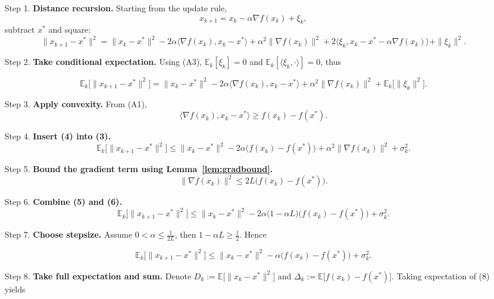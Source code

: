\documentclass{article}
\begin{document}
\begin{enumerate}
\item[Step 1.] \textbf{Distance recursion.}  
Starting from the update rule,
\[
x_{k+1}=x_k-\alpha\nabla f(x_k)+\xi_k,
\]
subtract $x^{*}$ and square:
\[
\|x_{k+1}-x^{*}\|^{2}
 =\|x_k-x^{*}\|^{2}
 -2\alpha\langle\nabla f(x_k),x_k-x^{*}\rangle
 +\alpha^{2}\|\nabla f(x_k)\|^{2}
 +2\langle\xi_k, x_k-x^{*}-\alpha\nabla f(x_k)\rangle
 +\|\xi_k\|^{2}.
\tag{2}
\]

\item[Step 2.] \textbf{Take conditional expectation.}  
Using (A3), $\mathbb{E}_k[\xi_k]=0$ and $\mathbb{E}_k[\langle\xi_k,\cdot\rangle]=0$, thus

\[
\mathbb{E}_k\!\big[\|x_{k+1}-x^{*}\|^{2}\big]
 =\|x_k-x^{*}\|^{2}
 -2\alpha\langle\nabla f(x_k),x_k-x^{*}\rangle
 +\alpha^{2}\|\nabla f(x_k)\|^{2}
 +\mathbb{E}_k\!\big[\|\xi_k\|^{2}\big].
\tag{3}
\]

\item[Step 3.] \textbf{Apply convexity.}  
From (A1),
\[
\langle\nabla f(x_k),x_k-x^{*}\rangle\ge f(x_k)-f(x^{*}).
\tag{4}
\]

\item[Step 4.] \textbf{Insert (4) into (3).}
\[
\mathbb{E}_k\!\big[\|x_{k+1}-x^{*}\|^{2}\big]
 \le\|x_k-x^{*}\|^{2}
 -2\alpha\big(f(x_k)-f(x^{*})\big)
 +\alpha^{2}\|\nabla f(x_k)\|^{2}
 +\sigma_k^{2}.
\tag{5}
\]

\item[Step 5.] \textbf{Bound the gradient term using Lemma~\ref{lem:gradbound}.}
\[
\|\nabla f(x_k)\|^{2}\le 2L\big(f(x_k)-f(x^{*})\big).
\tag{6}
\]

\item[Step 6.] \textbf{Combine (5) and (6).}
\[
\mathbb{E}_k\!\big[\|x_{k+1}-x^{*}\|^{2}\big]
 \le\|x_k-x^{*}\|^{2}
 -2\alpha\Big(1-\alpha L\Big)\big(f(x_k)-f(x^{*})\big)
 +\sigma_k^{2}.
\tag{7}
\]

\item[Step 7.] \textbf{Choose stepsize.}  
Assume $0<\alpha\le \frac{1}{2L}$, then $1-\alpha L\ge \frac12$. Hence

\[
\mathbb{E}_k\!\big[\|x_{k+1}-x^{*}\|^{2}\big]
 \le\|x_k-x^{*}\|^{2}
 -\alpha\big(f(x_k)-f(x^{*})\big)
 +\sigma_k^{2}.
\tag{8}
\]

\item[Step 8.] \textbf{Take full expectation and sum.}  
Denote $D_k:=\mathbb{E}\big[\|x_k-x^{*}\|^{2}\big]$ and $\Delta_k:=\mathbb{E}\big[f(x_k)-f(x^{*})\big]$.  
Taking expectation of (8) yields


\end{enumerate}
\end{document}

